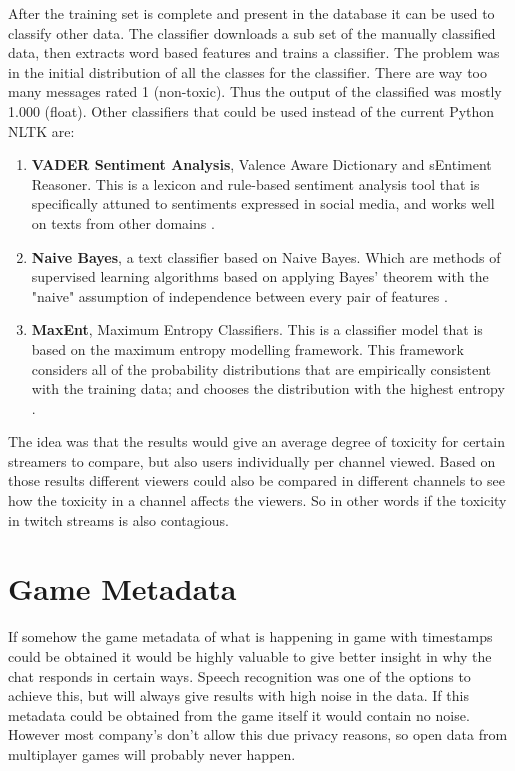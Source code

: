 \documentclass[final]{report}
\begin{document}
After the training set is complete and present in the database it can be used to classify other data. The classifier downloads a sub set of the manually classified data, then extracts word based features and trains a classifier.
The problem was in the initial distribution of all the classes for the classifier.
There are way too many messages rated 1 (non-toxic). Thus the output of the classified was mostly 1.000 (float). Other classifiers that could be used instead of the current Python NLTK are:

\begin{enumerate}
	\item \textbf{VADER Sentiment Analysis}, Valence Aware Dictionary and sEntiment Reasoner. This is a lexicon and rule-based sentiment analysis tool that is specifically attuned to sentiments expressed in social media, and works well on texts from other domains \cite{vader}.
	\item \textbf{Naive Bayes}, a text classifier based on Naive Bayes. Which are methods of supervised learning algorithms based on applying Bayes' theorem with the "naive" assumption of independence between every pair of features \cite{naivebayes}.
	\item \textbf{MaxEnt}, Maximum Entropy Classifiers. This is a classifier model that is based on the maximum entropy modelling framework. This framework considers all of the probability distributions that are empirically consistent with the training data; and chooses the distribution with the highest entropy \cite{maxent}.
\end{enumerate}

The idea was that the results would give an average degree of toxicity for certain streamers to compare, but also users individually per channel viewed. Based on those results different viewers could also be compared in different channels to see how the toxicity in a channel affects the viewers. So in other words if the toxicity in twitch streams is also contagious.

\section{Game Metadata}

If somehow the game metadata of what is happening in game with timestamps could be obtained it would be highly valuable to give better insight in why the chat responds in certain ways. Speech recognition was one of the options to achieve this, but will always give results with high noise in the data. If this metadata could be obtained from the game itself it would contain no noise. However most company's don't allow this due privacy reasons, so open data from multiplayer games will probably never happen.
\end{document}
